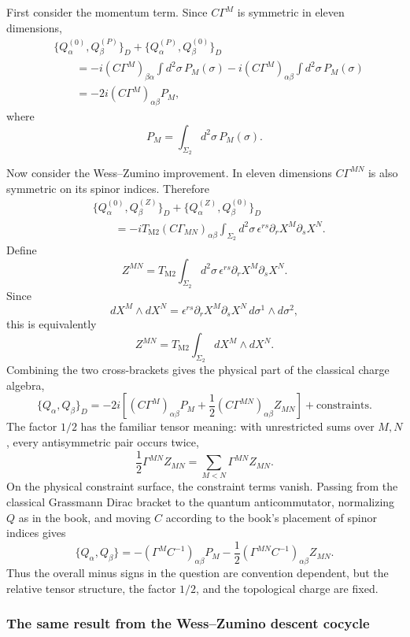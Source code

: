\documentclass[
  10pt,
  a4paper,
  openany]{book}
\begin{document}
First consider the momentum term. Since \(C\Gamma^M\) is symmetric in
eleven dimensions, \[
\begin{aligned}
&\{Q^{(0)}_\alpha,Q^{(P)}_\beta\}_{D}
+\{Q^{(P)}_\alpha,Q^{(0)}_\beta\}_{D}\\
&\qquad
=-i(C\Gamma^M)_{\beta\alpha}
\int d^2\sigma\,P_M(\sigma)
-i(C\Gamma^M)_{\alpha\beta}
\int d^2\sigma\,P_M(\sigma)\\
&\qquad
=-2i(C\Gamma^M)_{\alpha\beta}P_M,
\end{aligned}
\] where \[
P_M=\int_{\Sigma_2}d^2\sigma\,P_M(\sigma).
\]

Now consider the Wess--Zumino improvement. In eleven dimensions
\(C\Gamma^{MN}\) is also symmetric on its spinor indices. Therefore \[
\begin{aligned}
&\{Q^{(0)}_\alpha,Q^{(Z)}_\beta\}_{D}
+\{Q^{(Z)}_\alpha,Q^{(0)}_\beta\}_{D}\\
&\qquad
=-iT_{\mathrm{M2}}
(C\Gamma_{MN})_{\alpha\beta}
\int_{\Sigma_2}d^2\sigma\,
\epsilon^{rs}\partial_rX^M\partial_sX^N.
\end{aligned}
\] Define \[
\boxed{
Z^{MN}
=T_{\mathrm{M2}}
\int_{\Sigma_2}d^2\sigma\,
\epsilon^{rs}\partial_rX^M\partial_sX^N
}.
\] Since \[
dX^M\wedge dX^N
=\epsilon^{rs}\partial_rX^M\partial_sX^N
\,d\sigma^1\wedge d\sigma^2,
\] this is equivalently \[
\boxed{
Z^{MN}
=T_{\mathrm{M2}}
\int_{\Sigma_2}dX^M\wedge dX^N
}.
\] Combining the two cross-brackets gives the physical part of the
classical charge algebra, \[
\boxed{
\{Q_\alpha,Q_\beta\}_{D}
=-2i\left[
(C\Gamma^M)_{\alpha\beta}P_M
+\frac12(C\Gamma^{MN})_{\alpha\beta}Z_{MN}
\right]
+\text{constraints}
}.
\] The factor \(1/2\) has the familiar tensor meaning: with unrestricted
sums over \(M,N\), every antisymmetric pair occurs twice, \[
\frac12\Gamma^{MN}Z_{MN}
=\sum_{M<N}\Gamma^{MN}Z_{MN}.
\] On the physical constraint surface, the constraint terms vanish.
Passing from the classical Grassmann Dirac bracket to the quantum
anticommutator, normalizing \(Q\) as in the book, and moving \(C\)
according to the book's placement of spinor indices gives \[
\boxed{
\{Q_\alpha,Q_\beta\}
=-(\Gamma^M C^{-1})_{\alpha\beta}P_M
-\frac12
(\Gamma^{MN}C^{-1})_{\alpha\beta}Z_{MN}
}.
\] Thus the overall minus signs in the question are convention
dependent, but the relative tensor structure, the factor \(1/2\), and
the topological charge are fixed.

\subsubsection{The same result from the Wess--Zumino descent
cocycle}\label{the-same-result-from-the-wesszumino-descent-cocycle}
\end{document}
